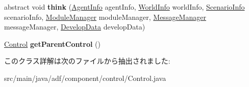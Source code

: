 \begin{DoxyCompactItemize}
\item 
\hypertarget{classadf_1_1component_1_1control_1_1Control_af7a9de770482255a8a6619217bf36598}{}\label{classadf_1_1component_1_1control_1_1Control_af7a9de770482255a8a6619217bf36598} 
abstract void {\bfseries think} (\hyperlink{classadf_1_1agent_1_1info_1_1AgentInfo}{Agent\+Info} agent\+Info, \hyperlink{classadf_1_1agent_1_1info_1_1WorldInfo}{World\+Info} world\+Info, \hyperlink{classadf_1_1agent_1_1info_1_1ScenarioInfo}{Scenario\+Info} scenario\+Info, \hyperlink{classadf_1_1agent_1_1module_1_1ModuleManager}{Module\+Manager} module\+Manager, \hyperlink{classadf_1_1agent_1_1communication_1_1MessageManager}{Message\+Manager} message\+Manager, \hyperlink{classadf_1_1agent_1_1develop_1_1DevelopData}{Develop\+Data} develop\+Data)
\item 
\hypertarget{classadf_1_1component_1_1control_1_1Control_adccbe65c8b9e73ebb17d8dd53273f41d}{}\label{classadf_1_1component_1_1control_1_1Control_adccbe65c8b9e73ebb17d8dd53273f41d} 
\hyperlink{classadf_1_1component_1_1control_1_1Control}{Control} {\bfseries get\+Parent\+Control} ()
\end{DoxyCompactItemize}


このクラス詳解は次のファイルから抽出されました\+:\begin{DoxyCompactItemize}
\item 
src/main/java/adf/component/control/Control.\+java\end{DoxyCompactItemize}
